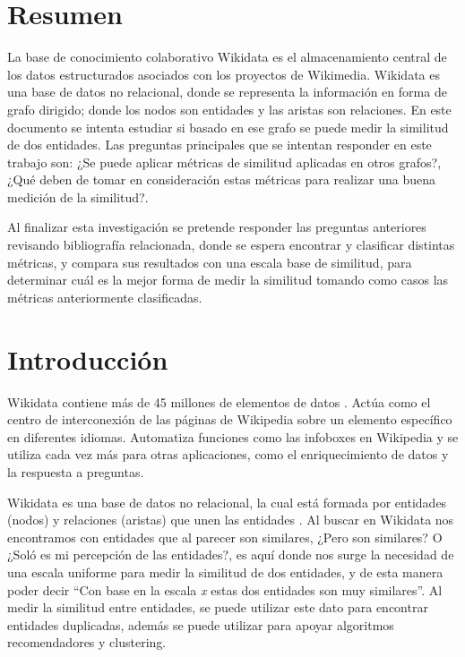 \section{Resumen}
La base de conocimiento colaborativo Wikidata \cite {vrandevcic2014wikidata} es el almacenamiento central de los datos estructurados asociados con los  proyectos de Wikimedia. Wikidata es una base de datos no relacional, donde se representa la información en forma de grafo dirigido; donde los nodos son entidades y las aristas son relaciones. En este documento se intenta estudiar si basado en ese grafo se puede medir la similitud de dos entidades. Las preguntas principales que se intentan responder en este trabajo son: ¿Se puede aplicar métricas de similitud aplicadas en otros grafos?, ¿Qué deben de tomar en consideración estas métricas para realizar una buena medición de la similitud?.

Al finalizar esta investigación se pretende responder las preguntas anteriores revisando bibliografía relacionada, donde se espera encontrar y clasificar distintas métricas, y compara sus resultados con una escala base de similitud, para determinar cuál es la mejor forma de medir la similitud tomando como casos las métricas anteriormente clasificadas.  
\section{Introducción}
Wikidata contiene más de 45 millones de elementos de datos \cite{balaraman2018recoin}. Actúa como el centro de interconexión de las páginas de Wikipedia sobre un elemento específico en diferentes idiomas. Automatiza funciones como las infoboxes en Wikipedia y se utiliza cada vez más para otras aplicaciones, como el enriquecimiento de datos y la respuesta a preguntas.

Wikidata es una base de datos no relacional, la cual está formada por entidades (nodos) y relaciones
(aristas) que unen las entidades  \cite{vrandevcic2014wikidata}. Al buscar en Wikidata nos encontramos con entidades que al  parecer son similares, ¿Pero son similares? O ¿Soló es mi percepción de las entidades?, es aquí donde nos surge la necesidad de una escala uniforme para medir la similitud  de dos entidades, y de esta
manera poder decir “Con base en la escala \textit{x} estas dos entidades son muy similares”. Al medir la similitud entre entidades, se puede utilizar este dato para encontrar entidades duplicadas, además  se puede utilizar para apoyar algoritmos recomendadores  y clustering.

